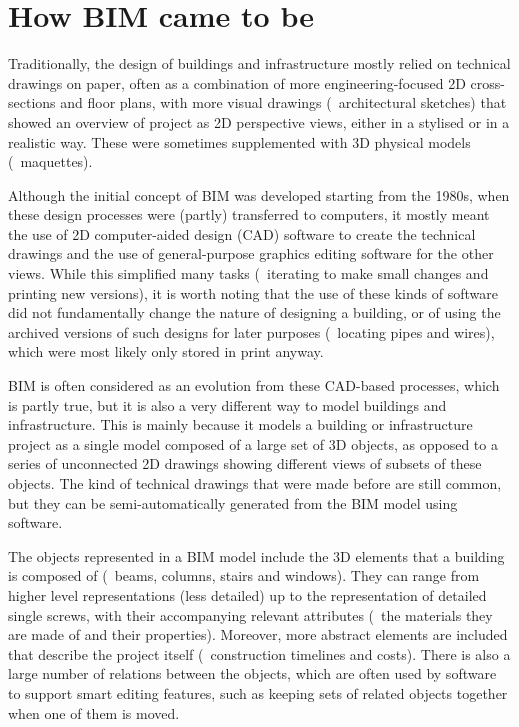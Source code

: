 \section{How BIM came to be}

Traditionally, the design of buildings and infrastructure mostly relied on technical drawings on paper, often as a combination of more engineering-focused 2D cross-sections and floor plans, with more visual drawings (\eg\ architectural sketches) that showed an overview of project as 2D perspective views, either in a stylised or in a realistic way.
These were sometimes supplemented with 3D physical models (\ie\ maquettes).

Although the initial concept of BIM was developed starting from the 1980s, when these design processes were (partly) transferred to computers, it mostly meant the use of 2D computer-aided design (CAD) software to create the technical drawings and the use of general-purpose graphics editing software for the other views.
While this simplified many tasks (\eg\ iterating to make small changes and printing new versions), it is worth noting that the use of these kinds of software did not fundamentally change the nature of designing a building, or of using the archived versions of such designs for later purposes (\eg\ locating pipes and wires), which were most likely only stored in print anyway.

BIM is often considered as an evolution from these CAD-based processes, which is partly true, but it is also a very different way to model buildings and infrastructure.
This is mainly because it models a building or infrastructure project as a single model composed of a large set of 3D objects, as opposed to a series of unconnected 2D drawings showing different views of subsets of these objects.
The kind of technical drawings that were made before are still common, but they can be semi-automatically generated from the BIM model using software.

The objects represented in a BIM model include the 3D elements that a building is composed of (\eg\ beams, columns, stairs and windows).
They can range from higher level representations (less detailed) up to the representation of detailed single screws, with their accompanying relevant attributes (\eg\ the materials they are made of and their properties).
Moreover, more abstract elements are included that describe the project itself (\eg\ construction timelines and costs).
There is also a large number of relations between the objects, which are often used by software to support smart editing features, such as keeping sets of related objects together when one of them is moved.

